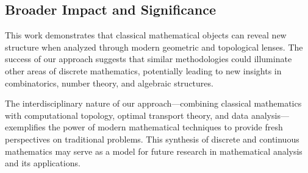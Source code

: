 \subsection{Broader Impact and Significance}

This work demonstrates that classical mathematical objects can reveal new structure when analyzed through modern geometric and topological lenses. The success of our approach suggests that similar methodologies could illuminate other areas of discrete mathematics, potentially leading to new insights in combinatorics, number theory, and algebraic structures.

The interdisciplinary nature of our approach—combining classical mathematics with computational topology, optimal transport theory, and data analysis—exemplifies the power of modern mathematical techniques to provide fresh perspectives on traditional problems. This synthesis of discrete and continuous mathematics may serve as a model for future research in mathematical analysis and its applications. 